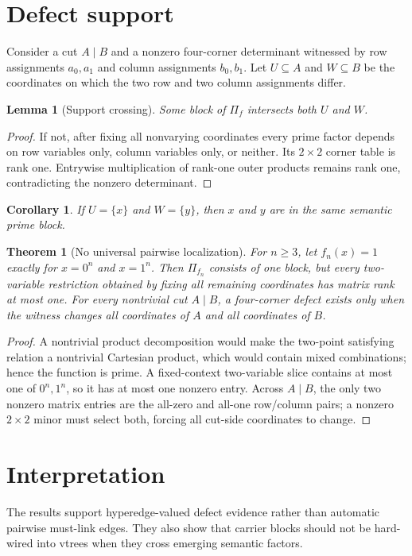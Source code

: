 \documentclass[11pt]{article}
\newtheorem{theorem}{Theorem}
\newtheorem{lemma}{Lemma}
\newtheorem{corollary}{Corollary}
\begin{document}
\section{Defect support}
Consider a cut $A\mid B$ and a nonzero four-corner determinant witnessed by row assignments $a_0,a_1$ and column assignments $b_0,b_1$. Let $U\subseteq A$ and $W\subseteq B$ be the coordinates on which the two row and two column assignments differ.

\begin{lemma}[Support crossing]
Some block of $\Pi_f$ intersects both $U$ and $W$.
\end{lemma}
\begin{proof}
If not, after fixing all nonvarying coordinates every prime factor depends on row variables only, column variables only, or neither. Its $2\times2$ corner table is rank one. Entrywise multiplication of rank-one outer products remains rank one, contradicting the nonzero determinant.
\end{proof}

\begin{corollary}
If $U=\{x\}$ and $W=\{y\}$, then $x$ and $y$ are in the same semantic prime block.
\end{corollary}

\begin{theorem}[No universal pairwise localization]
For $n\ge 3$, let $f_n(x)=1$ exactly for $x=0^n$ and $x=1^n$. Then $\Pi_{f_n}$ consists of one block, but every two-variable restriction obtained by fixing all remaining coordinates has matrix rank at most one. For every nontrivial cut $A\mid B$, a four-corner defect exists only when the witness changes all coordinates of $A$ and all coordinates of $B$.
\end{theorem}
\begin{proof}
A nontrivial product decomposition would make the two-point satisfying relation a nontrivial Cartesian product, which would contain mixed combinations; hence the function is prime. A fixed-context two-variable slice contains at most one of $0^n,1^n$, so it has at most one nonzero entry. Across $A\mid B$, the only two nonzero matrix entries are the all-zero and all-one row/column pairs; a nonzero $2\times2$ minor must select both, forcing all cut-side coordinates to change.
\end{proof}

\section{Interpretation}
The results support hyperedge-valued defect evidence rather than automatic pairwise must-link edges. They also show that carrier blocks should not be hard-wired into vtrees when they cross emerging semantic factors.
\end{document}
